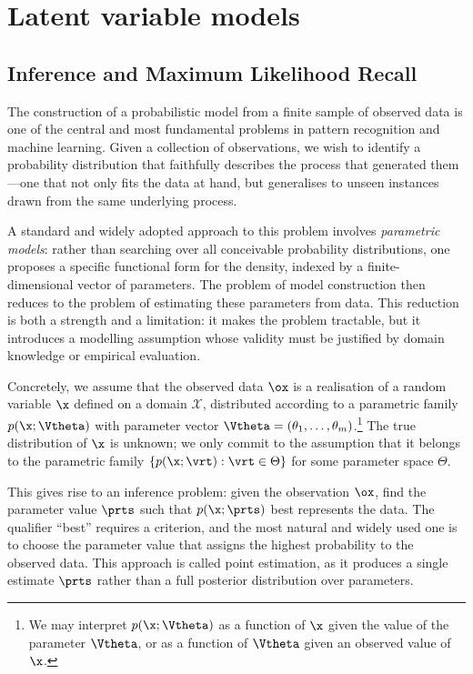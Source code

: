 \chapter{Latent variable models}

\section*{Inference and Maximum Likelihood Recall}\label{sec:ml}

The construction of a probabilistic model from a finite sample of observed data is one of
the central and most fundamental problems in pattern recognition and machine learning.
Given a collection of observations, we wish to identify a probability distribution that
faithfully describes the process that generated them---one that not only fits the data at
hand, but generalises to unseen instances drawn from the same underlying process.

A standard and widely adopted approach to this problem involves \emph{parametric
models}: rather than searching over all conceivable probability distributions, one proposes
a specific functional form for the density, indexed by a finite-dimensional vector of
parameters. The problem of model construction then reduces to the problem of estimating
these parameters from data. This reduction is both a strength and a limitation: it makes
the problem tractable, but it introduces a modelling assumption whose validity must be
justified by domain knowledge or empirical evaluation.

Concretely, we assume that the observed data $\ox$ is a realisation of a random variable
$\x$ defined on a domain $\mathcal{X}$, distributed according to a parametric family
$p(\x; \Vtheta)$ with parameter vector $\Vtheta = (\theta_1, \ldots, \theta_m)$.\footnote{We
may interpret $p(\x; \Vtheta)$ as a function of $\x$ given the value of the parameter
$\Vtheta$, or as a function of $\Vtheta$ given an observed value of $\x$.} The true
distribution of $\x$ is unknown; we only commit to the assumption that it belongs to the
parametric family $\{p(\x;\vrt) : \vrt \in \Theta\}$ for some parameter space $\Theta$.

This gives rise to an \alert{inference} problem: given the observation $\ox$, find the
parameter value $\prts$ such that $p(\x;\prts)$ best represents the data. The qualifier
``best'' requires a criterion, and the most natural and widely used one is to choose the
parameter value that assigns the highest probability to the observed data. This approach is
called \alert{point estimation}, as it produces a single estimate $\prts$ rather than a full
posterior distribution over parameters.

